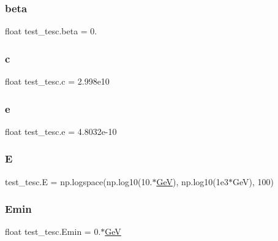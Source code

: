 \subsubsection{\texorpdfstring{beta}{beta}}
{\footnotesize\ttfamily float test\+\_\+tesc.\+beta = 0.}

\mbox{\label{namespacetest__tesc_aed2debd6db9c687f9067b733f0ed5862}} 
\subsubsection{\texorpdfstring{c}{c}}
{\footnotesize\ttfamily float test\+\_\+tesc.\+c = 2.\+998e10}

\mbox{\label{namespacetest__tesc_ab826e01cd079a1822d79af10a8d95b42}} 
\subsubsection{\texorpdfstring{e}{e}}
{\footnotesize\ttfamily float test\+\_\+tesc.\+e = 4.\+8032e-\/10}

\mbox{\label{namespacetest__tesc_a4789c617e691141d9a78952c8e9bbe4d}} 
\subsubsection{\texorpdfstring{E}{E}}
{\footnotesize\ttfamily test\+\_\+tesc.\+E = np.\+logspace(np.\+log10(10.$\ast$\hyperlink{namespacetest__tesc_a580dcae7e8e8d361c974fbb0fe6bee35}{GeV}), np.\+log10(1e3$\ast$\+Ge\+V), 100)}

\mbox{\label{namespacetest__tesc_a3f53d131ed6d829798ebac880deeba41}} 
\subsubsection{\texorpdfstring{Emin}{Emin}}
{\footnotesize\ttfamily float test\+\_\+tesc.\+Emin = 0.$\ast$\hyperlink{namespacetest__tesc_a580dcae7e8e8d361c974fbb0fe6bee35}{GeV}}

